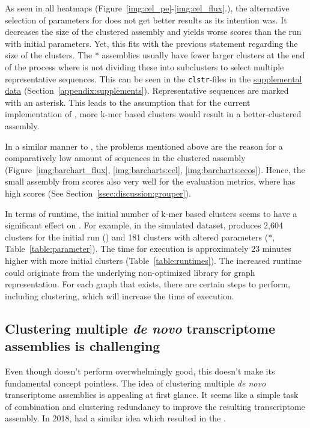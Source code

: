 \documentclass[12pt,a4paper,english]{article}
\begin{document}
	As seen in all heatmaps (Figure~\ref{img:cel_pe}-\ref{img:cel_flux}.), the alternative selection of parameters for \karma does not get better results as its intention was. It decreases the size of the clustered assembly and yields worse scores than the run with initial parameters. Yet, this fits with the previous statement regarding the size of the clusters. The \karma{}* assemblies usually have fewer larger clusters at the end of the process where \mcl is not dividing these into subclusters to select multiple representative sequences. This can be seen in the \texttt{clstr}-files in the \href{}{supplemental data} (Section~\ref{appendix:supplements}). Representative sequences are marked with an asterisk.
	This leads to the assumption that for the current implementation of \karma, more k-mer based clusters would result in a better-clustered assembly.
	
	In a similar manner to \grouper, the problems mentioned above are the reason for a comparatively low amount of sequences in the clustered assembly (Figure~\ref{img:barchart_flux}, \ref{img:barcharts:cel}, \ref{img:barcharts:ecos}). Hence, the small assembly from \karma scores also very well for the evaluation metrics, where \grouper has high scores (See Section~\ref{ssec:discussion:grouper}).
	
	In terms of runtime, the initial number of k-mer based clusters seems to have a significant effect on \karma. 
	For example, in the simulated dataset, \hdbscan produces 2,604 clusters for the initial run (\karma) and 181 clusters with altered parameters (\karma{}*, Table~\ref{table:parameter}). The time for execution is approximately 23 minutes higher with more initial clusters (Table~\ref{table:runtimes}). The increased runtime could originate from the underlying non-optimized library for graph representation. For each graph that exists, there are certain steps to perform, including \mcl clustering, which will increase the time of execution.
	
	\subsection{Clustering multiple \textit{de novo} transcriptome assemblies is challenging}
	    Even though \karma doesn't perform overwhelmingly good, this doesn't make its fundamental concept pointless.
		The idea of clustering multiple \textit{de novo} transcriptome assemblies is appealing at first glance. It seems like a simple task of combination and clustering redundancy to improve the resulting transcriptome assembly. In 2018, \citeauthor{OysterRiverProtocol:18} had a similar idea which resulted in the \orp.
		
\end{document}
